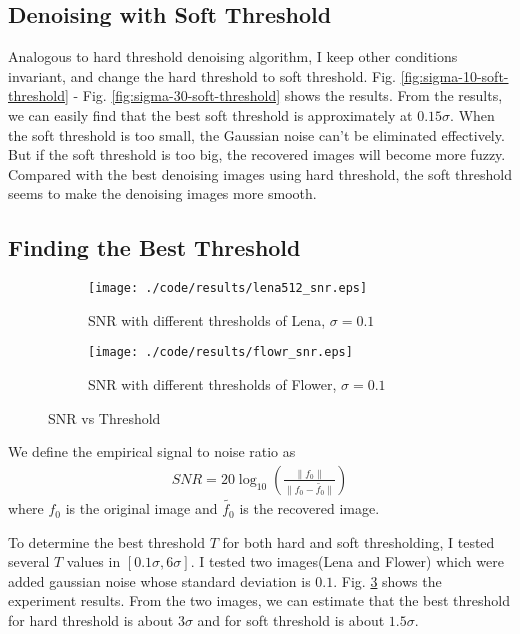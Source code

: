 \documentclass[journal,comsoc]{IEEEtran}
\begin{document}
\subsection{Denoising with Soft Threshold}
\label{subsec:denoising-with-soft-thresholding}

Analogous to hard threshold denoising algorithm, I keep other conditions invariant, and
change the hard threshold to soft threshold. Fig. \ref{fig:sigma-10-soft-threshold} -
Fig. \ref{fig:sigma-30-soft-threshold} shows the results. From the results, we can
easily find that the best soft threshold is approximately at $0.15\sigma$. When the
soft threshold is too small, the Gaussian noise can't be eliminated effectively. But
if the soft threshold is too big, the recovered images will become more fuzzy.
Compared with the best denoising images using hard threshold, the soft threshold seems
to make the denoising images more smooth.



\subsection{Finding the Best Threshold}
\label{subsec:finding-the-best-threshold}

\begin{figure}[!hbt]
  \centering
  \begin{subfigure}{.36\textwidth}
    \centering
    \texttt{[image: ./code/results/lena512\_snr.eps]}
    \caption{SNR with different thresholds of Lena, $\sigma=0.1$}
    \label{subfig:snr-threshold-lena}
  \end{subfigure}
  \begin{subfigure}{.36\textwidth}
    \centering
    \texttt{[image: ./code/results/flowr\_snr.eps]}
    \caption{SNR with different thresholds of Flower, $\sigma=0.1$}
    \label{subfig:snr-threshold-flower}
  \end{subfigure}
  \caption{SNR vs Threshold}
  \label{fig:snr-lena-flower}
\end{figure}

We define the empirical signal to noise ratio as
\begin{eqnarray}
  SNR=20\log_{10}(\frac{\|f_0\|}{\|f_0-\tilde{f_0}\|})
\end{eqnarray}
where $f_0$ is the original image and $\tilde{f_0}$ is the recovered image.

To determine the best threshold $T$ for both hard and soft thresholding, I tested several
$T$ values in $[0.1\sigma,6\sigma]$. I tested two images(Lena and Flower) which were added gaussian noise
whose standard deviation is $0.1$. Fig. \ref{fig:snr-lena-flower} shows the experiment results.
From the two images, we can estimate that the best threshold for hard threshold is about $3\sigma$
and for soft threshold is about $1.5\sigma$.
\end{document}
